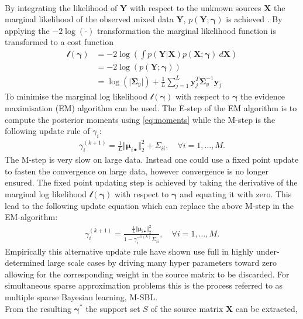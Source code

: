 \\
By integrating the likelihood of $\textbf{Y}$ with respect to the unknown sources $\mathbf{X}$ the marginal likelihood of the observed mixed data $\mathbf{Y}$, $p (\mathbf{Y} ; \boldsymbol{\gamma})$ is achieved \cite[p. 146]{phd_wipf}. By applying the $-2 \log (\cdot)$ transformation the marginal likelihood function is transformed to a cost function
\begin{align*}
\mathcal{l}(\boldsymbol{\gamma}) &= -2 \log \left( \int p (\mathbf{Y}  \vert \mathbf{X}) p (\mathbf{X} ; \boldsymbol{\gamma}) \ d\mathbf{X} \right) \\
&= - 2 \log(p (\mathbf{Y} ; \boldsymbol{\gamma}))\\
&= \log ( \vert \boldsymbol{\Sigma}_y \vert) + \frac{1}{L} \sum_{j=1}^L \mathbf{y}_{j}^T \boldsymbol{\Sigma}_y ^{-1} \mathbf{y}_{j}
\end{align*}
To minimise the marginal log likelihood $\mathcal{l}(\boldsymbol{\gamma})$ with respect to $\boldsymbol{\gamma}$ the evidence maximisation (EM) algorithm can be used. The E-step of the EM algorithm is to compute the posterior moments using \eqref{eq:moments} while the M-step is the following update rule of $\gamma_i$:
\begin{align*}
\gamma_i^{(k+1)} = \frac{1}{L} \Vert \boldsymbol{\mu}_{i \bullet} \Vert_2^2 + \Sigma_{ii}, \quad \forall i = 1, \dots, M.
\end{align*}
The M-step is very slow on large data. Instead one could use a fixed point update to fasten the convergence on large data, however convergence is no longer ensured. The fixed point updating step is achieved by taking the derivative of the marginal log likelihood $\mathcal{l}(\boldsymbol{\gamma})$ with respect to $\boldsymbol{\gamma}$ and equating it with zero. This lead to the following update equation which can replace the above M-step in the EM-algorithm:
\begin{align*}
\gamma_i^{(k+1)} = \frac{\frac{1}{L} \Vert \boldsymbol{\mu}_{i \bullet} \Vert_2^2}{1 - \gamma_i^{-1 (k)} \Sigma_{ii}}, \quad \forall i = 1, \dots, M.
\end{align*}
Empirically this alternative update rule have shown use full in highly under-determined large scale cases by driving many hyper parameters toward zero allowing for the corresponding weight in the source matrix to be discarded. For simultaneous sparse approximation problems this is the process referred to as multiple sparse Bayesian learning, M-SBL.\\
From the resulting $\boldsymbol{\gamma}^\ast$ the support set $S$ of the source matrix $\textbf{X}$ can be extracted, 
